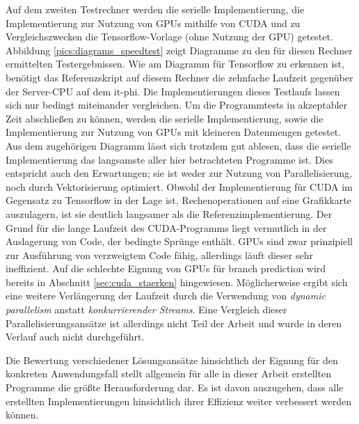 \documentclass[../main.tex]{subfiles}
\begin{document}
Auf dem zweiten Testrechner werden die serielle Implementierung, die Implementierung zur Nutzung von GPUs mithilfe von CUDA und zu Vergleichszwecken die Tensorflow-Vorlage (ohne Nutzung der GPU) getestet. Abbildung \ref{pics:diagrams_speedtest} zeigt Diagramme zu den für diesen Rechner ermittelten Testergebnissen. Wie am Diagramm für Tensorflow zu erkennen ist, benötigt das Referenzskript auf diesem Rechner die zehnfache Laufzeit gegenüber der Server-CPU auf dem it-phi. Die Implementierungen dieses Testlaufs lassen sich nur bedingt miteinander vergleichen. Um die Programmtests in akzeptabler Zeit abschließen zu können, werden die serielle Implementierung, sowie die Implementierung zur Nutzung von GPUs mit kleineren Datenmengen getestet. Aus dem zugehörigen Diagramm lässt sich trotzdem gut ablesen, dass die serielle Implementierung das langsamste aller hier betrachteten Programme ist. Dies entspricht auch den Erwartungen; sie ist weder zur Nutzung von Parallelisierung, noch durch Vektorisierung optimiert. Obwohl der Implementierung für CUDA im Gegensatz zu Tensorflow in der Lage ist, Rechenoperationen auf eine Grafikkarte auszulagern, ist sie deutlich langsamer als die Referenzimplementierung. Der Grund für die lange Laufzeit des CUDA-Programms liegt vermutlich in der Auslagerung von Code, der bedingte Sprünge enthält. GPUs sind zwar prinzipiell zur Ausführung von verzweigtem Code fähig, allerdings läuft dieser sehr ineffizient. Auf die schlechte Eignung von GPUs für branch prediction wird bereits in Abschnitt \ref{sec:cuda_staerken} hingewiesen. Möglicherweise ergibt sich eine weitere Verlängerung der Laufzeit durch die Verwendung von \emph{dynamic parallelism} anstatt \emph{konkurrierender Streams}. Eine Vergleich dieser Parallelisierungsansätze ist allerdings nicht Teil der Arbeit und wurde in deren Verlauf auch nicht durchgeführt. 

Die Bewertung verschiedener Lösungsansätze hinsichtlich der Eignung für den konkreten Anwendungsfall stellt allgemein für alle in dieser Arbeit erstellten Programme die größte Herausforderung dar. Es ist davon auszugehen, dass alle erstellten Implementierungen hinsichtlich ihrer Effizienz weiter verbessert werden können. 
\end{document}
